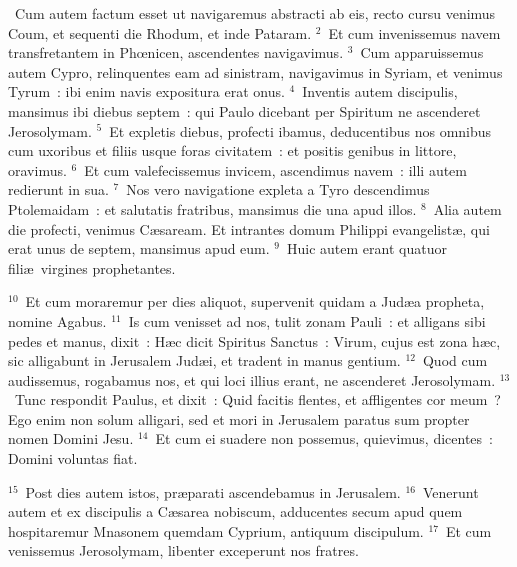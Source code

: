 ~Cum autem factum esset ut navigaremus abstracti ab eis, recto cursu venimus Coum, et sequenti die Rhodum, et inde Pataram.
${}^{2}$~Et cum invenissemus navem transfretantem in Phœnicen, ascendentes navigavimus.
${}^{3}$~Cum apparuissemus autem Cypro, relinquentes eam ad sinistram, navigavimus in Syriam, et venimus Tyrum~: ibi enim navis expositura erat onus.
${}^{4}$~Inventis autem discipulis, mansimus ibi diebus septem~: qui Paulo dicebant per Spiritum ne ascenderet Jerosolymam.
${}^{5}$~Et expletis diebus, profecti ibamus, deducentibus nos omnibus cum uxoribus et filiis usque foras civitatem~: et positis genibus in littore, oravimus.
${}^{6}$~Et cum valefecissemus invicem, ascendimus navem~: illi autem redierunt in sua.
${}^{7}$~Nos vero navigatione expleta a Tyro descendimus Ptolemaidam~: et salutatis fratribus, mansimus die una apud illos.
${}^{8}$~Alia autem die profecti, venimus C\ae saream. Et intrantes domum Philippi evangelist\ae , qui erat unus de septem, mansimus apud eum.
${}^{9}$~Huic autem erant quatuor fili\ae\ virgines prophetantes.


${}^{10}$~Et cum moraremur per dies aliquot, supervenit quidam a Jud\ae a propheta, nomine Agabus.
${}^{11}$~Is cum venisset ad nos, tulit zonam Pauli~: et alligans sibi pedes et manus, dixit~: H\ae c dicit Spiritus Sanctus~: Virum, cujus est zona h\ae c, sic alligabunt in Jerusalem Jud\ae i, et tradent in manus gentium.
${}^{12}$~Quod cum audissemus, rogabamus nos, et qui loci illius erant, ne ascenderet Jerosolymam.
${}^{13}$~Tunc respondit Paulus, et dixit~: Quid facitis flentes, et affligentes cor meum~? Ego enim non solum alligari, sed et mori in Jerusalem paratus sum propter nomen Domini Jesu.
${}^{14}$~Et cum ei suadere non possemus, quievimus, dicentes~: Domini voluntas fiat.


${}^{15}$~Post dies autem istos, pr\ae parati ascendebamus in Jerusalem.
${}^{16}$~Venerunt autem et ex discipulis a C\ae sarea nobiscum, adducentes secum apud quem hospitaremur Mnasonem quemdam Cyprium, antiquum discipulum.
${}^{17}$~Et cum venissemus Jerosolymam, libenter exceperunt nos fratres.


